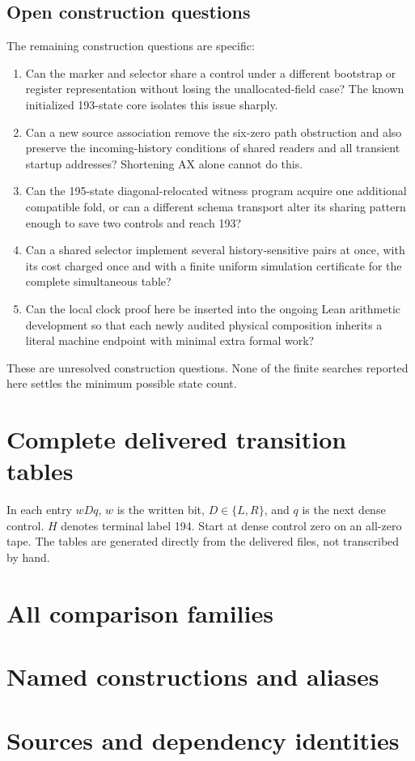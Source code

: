 \documentclass[11pt,letterpaper]{article}
\begin{document}
\subsection{Open construction questions}
The remaining construction questions are specific:
\begin{enumerate}
\item Can the marker and selector share a control under a different
bootstrap or register representation without losing the unallocated-field
case? The known initialized 193-state core isolates this issue sharply.
\item Can a new source association remove the six-zero path obstruction
and also preserve the incoming-history conditions of shared readers and
all transient startup addresses? Shortening AX alone cannot do this.
\item Can the 195-state diagonal-relocated witness program acquire one
additional compatible fold, or can a different schema transport alter its
sharing pattern enough to save two controls and reach 193?
\item Can a shared selector implement several history-sensitive pairs at
once, with its cost charged once and with a finite uniform simulation
certificate for the complete simultaneous table?
\item Can the local clock proof here be inserted into the ongoing Lean
arithmetic development so that each newly audited physical composition
inherits a literal machine endpoint with minimal extra formal work?
\end{enumerate}
These are unresolved construction questions. None of the finite searches
reported here settles the minimum possible state count.

\appendix
\clearpage
\section{Complete delivered transition tables}
\label{app:tables}
In each entry $wDq$, $w$ is the written bit, $D\in\{L,R\}$, and $q$ is
the next dense control. $H$ denotes terminal label 194. Start at dense
control zero on an all-zero tape. The tables are generated directly from
the delivered files, not transcribed by hand.

\clearpage
\section{All comparison families}
\label{app:families}

\clearpage
\section{Named constructions and aliases}
\label{app:named}

\clearpage
\section{Sources and dependency identities}

\end{document}
